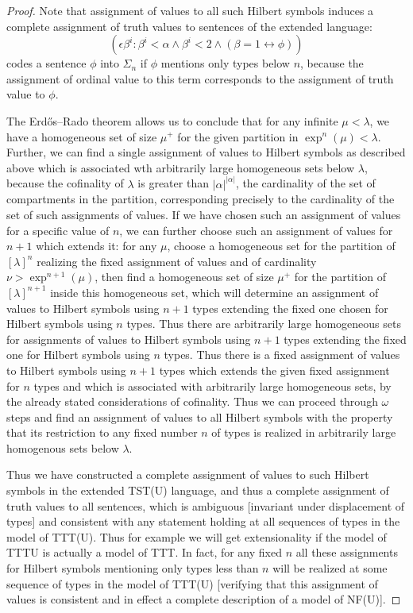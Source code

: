\documentclass{article}
\theoremstyle{definition}
\theoremstyle{remark}
\begin{document}
\begin{proof}
Note that assignment of values to all such Hilbert symbols induces a complete assignment of truth values to sentences of the extended language:  $$(\epsilon \beta^i:\beta^i<\alpha \wedge \beta^i<2 \wedge (\beta=1 \leftrightarrow \phi))$$ codes a sentence $\phi$ into $\Sigma_n$ if $\phi$ mentions only types below $n$, because the assignment of ordinal value to this term corresponds to the assignment of truth value to $\phi$.

The Erd\H{o}s--Rado theorem allows us to conclude that for any infinite $\mu<\lambda$, we have a homogeneous set of size $\mu^+$ for the given partition in $\exp^n(\mu)<\lambda$.
Further, we can find a single assignment of values to Hilbert symbols as described above which is associated wth arbitrarily large homogeneous sets below $\lambda$, because the cofinality of $\lambda$ is greater than $|\alpha|^{|\alpha|}$, the cardinality of the set of compartments in the partition, corresponding precisely to the cardinality of the set of such assignments of values.
If we have chosen such an assignment of values for a specific value of $n$, we can further choose such an assignment of values for $n+1$ which extends it:  for any $\mu$, choose a homogeneous set for the partition of $[\lambda]^n$ realizing the fixed assignment of values and of cardinality $\nu > \exp^{n+1}(\mu)$, then find a homogeneous set of size $\mu^+$ for the partition of $[\lambda]^{n+1}$ inside this homogeneous set, which will determine an assignment of values to Hilbert symbols using $n+1$ types extending the fixed one chosen for Hilbert symbols using $n$ types.  Thus there are arbitrarily large homogeneous sets for
assignments of values to Hilbert symbols using $n+1$ types extending the fixed one for Hilbert symbols using $n$ types.  Thus there is a fixed assignment of values to Hilbert symbols using $n+1$ types which extends the given fixed assignment for $n$ types and which is associated with arbitrarily large homogeneous sets, by the already stated considerations of cofinality.  Thus we can proceed through $\omega$ steps and find an assignment of values to all Hilbert symbols with the property that its restriction to any fixed number $n$ of types is realized in arbitrarily large homogenous sets below $\lambda$.

Thus we have constructed a complete assignment of values to such Hilbert symbols in the extended TST(U) language, and thus a complete assignment of truth values to all sentences, which is ambiguous [invariant under displacement of types] and consistent with any statement holding at all sequences of types in the model of TTT(U).  Thus for example we will get extensionality if the model of TTTU is actually a model of TTT.   In fact, for any fixed $n$ all these assignments for Hilbert symbols mentioning only types less than $n$ will be realized at some sequence of types in the model of TTT(U) [verifying that this assignment of values is consistent and in effect a complete description of a model of NF(U)].


\end{proof}
\end{document}
